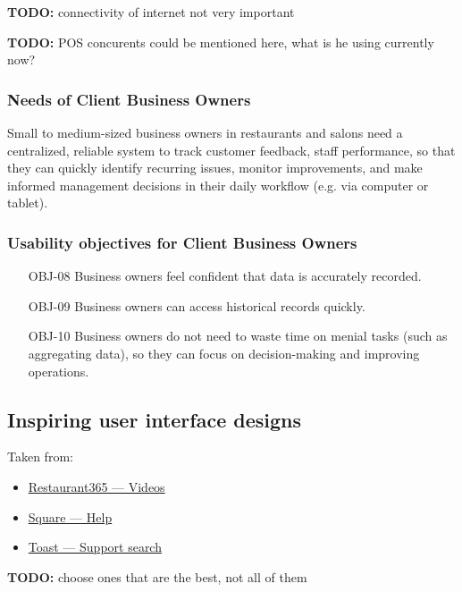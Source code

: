 \documentclass[]{VUMIFTemplateClass}
\newcommand{\todocomment}[1]{%
    \begin{tcolorbox}[colback=red!20, colframe=red!60, arc=0pt, outer arc=0pt, boxrule=1pt, left=3pt, right=3pt, top=3pt, bottom=3pt]
        \textbf{\textcolor{orange!70!black}{TODO:}} #1
    \end{tcolorbox}
}
\begin{document}
    \todocomment{connectivity of internet not very important}
    \todocomment{POS concurents could be mentioned here, what is he using currently now?}

\subsubsection{Needs of Client Business Owners}
Small to medium-sized business owners in restaurants and salons need a centralized, reliable system to track customer feedback, staff performance, so that they can quickly identify recurring issues, monitor improvements, and make informed management decisions in their daily workflow (e.g. via computer or tablet).

\subsubsection{Usability objectives for Client Business Owners}
\begin{itemize}
    \item[OBJ-08] Business owners feel confident that data is accurately recorded.
    \item[OBJ-09] Business owners can access historical records quickly.
    \item[OBJ-10] Business owners do not need to waste time on menial tasks (such as aggregating data), so they can focus on decision-making and improving operations.
\end{itemize}

\subsection{Inspiring user interface designs}


Taken from:
\begin{itemize}
     \item \href{https://www.restaurant365.com/resource-category/videos/}{Restaurant365 — Videos}
     \item \href{https://squareup.com/help/us/en}{Square — Help}
     \item \href{https://support.toasttab.com/search/#f-100=Account%20Settings%20%26%20Billing,Marketing,Menu%20%26%20Items,POS%20%26%20Location%20Operations,Takeout%20%26%20Catering&f-@commonsource=Videos&f-@language=English}{Toast — Support search}
\end{itemize}

\todocomment{choose ones that are the best, not all of them}
\end{document}
